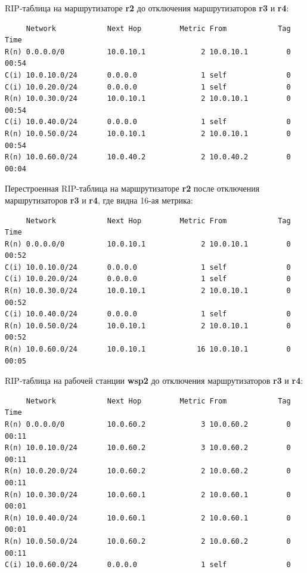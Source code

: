 \documentclass[a4paper,12pt]{article}
\begin{document}
RIP-таблица на маршрутизаторе \textbf{r2} до отключения маршрутизаторов \textbf{r3} и \textbf{r4}:

\begin{Verbatim}
     Network            Next Hop         Metric From            Tag Time
R(n) 0.0.0.0/0          10.0.10.1             2 10.0.10.1         0 00:54
C(i) 10.0.10.0/24       0.0.0.0               1 self              0
C(i) 10.0.20.0/24       0.0.0.0               1 self              0
R(n) 10.0.30.0/24       10.0.10.1             2 10.0.10.1         0 00:54
C(i) 10.0.40.0/24       0.0.0.0               1 self              0
R(n) 10.0.50.0/24       10.0.10.1             2 10.0.10.1         0 00:54
R(n) 10.0.60.0/24       10.0.40.2             2 10.0.40.2         0 00:04
\end{Verbatim}

Перестроенная RIP-таблица на маршрутизаторе \textbf{r2} после отключения маршрутизаторов \textbf{r3} и \textbf{r4}, где видна 16-ая метрика:

\begin{Verbatim}
     Network            Next Hop         Metric From            Tag Time
R(n) 0.0.0.0/0          10.0.10.1             2 10.0.10.1         0 00:52
C(i) 10.0.10.0/24       0.0.0.0               1 self              0
C(i) 10.0.20.0/24       0.0.0.0               1 self              0
R(n) 10.0.30.0/24       10.0.10.1             2 10.0.10.1         0 00:52
C(i) 10.0.40.0/24       0.0.0.0               1 self              0
R(n) 10.0.50.0/24       10.0.10.1             2 10.0.10.1         0 00:52
R(n) 10.0.60.0/24       10.0.10.1            16 10.0.10.1         0 00:05
\end{Verbatim}

RIP-таблица на рабочей станции \textbf{wsp2} до отключения маршрутизаторов \textbf{r3} и \textbf{r4}:

\begin{Verbatim}
     Network            Next Hop         Metric From            Tag Time
R(n) 0.0.0.0/0          10.0.60.2             3 10.0.60.2         0 00:11
R(n) 10.0.10.0/24       10.0.60.2             3 10.0.60.2         0 00:11
R(n) 10.0.20.0/24       10.0.60.2             2 10.0.60.2         0 00:11
R(n) 10.0.30.0/24       10.0.60.1             2 10.0.60.1         0 00:01
R(n) 10.0.40.0/24       10.0.60.1             2 10.0.60.1         0 00:01
R(n) 10.0.50.0/24       10.0.60.2             2 10.0.60.2         0 00:11
C(i) 10.0.60.0/24       0.0.0.0               1 self              0
\end{Verbatim}
\end{document}
